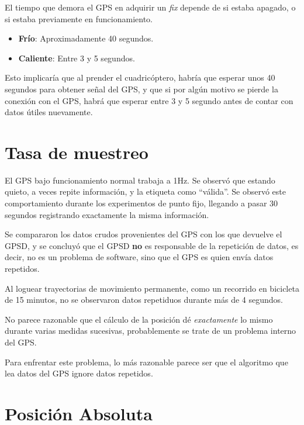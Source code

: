 \documentclass[main]{subfiles}
\begin{document}
El tiempo que demora el GPS en adquirir un \textit{fix} depende de si estaba apagado, o si estaba previamente en funcionamiento.
\begin{itemize}
\item \textbf{Frío}: Aproximadamente 40 segundos.
\item \textbf{Caliente}: Entre 3 y 5 segundos.
\end{itemize}

Esto implicaría que al prender el cuadricóptero, habría que esperar unos 40 segundos para obtener se\~nal del GPS, y que si por algún motivo se pierde la conexión con el GPS, habrá que esperar entre 3 y 5 segundo antes de contar con datos útiles nuevamente.

\section{Tasa de muestreo}
\label{sec:tasa-de-muestreo}

El GPS bajo funcionamiento normal trabaja a 1Hz. Se observó que estando quieto, a veces repite información, y la etiqueta como ``válida''. Se observó este comportamiento durante los experimentos de punto fijo, llegando a pasar 30 segundos registrando exactamente la misma información.

Se compararon los datos crudos provenientes del GPS con los que devuelve el GPSD, y se concluyó que el GPSD \textbf{no} es responsable de la repetición de datos, es decir, no es un problema de software, sino que el GPS es quien env\'ia datos repetidos.

Al loguear trayectorias de movimiento permanente, como un recorrido en bicicleta de 15 minutos, no se observaron  datos repetiduos durante más de 4 segundos.

No parece razonable que el cálculo de la posición dé \textit{exactamente} lo mismo durante varias medidas sucesivas, probablemente se trate de un problema interno del GPS.

Para enfrentar este problema, lo más razonable parece ser que el algoritmo que lea datos del GPS ignore datos repetidos.

\section{Posición Absoluta}
\label{sec:posicion-absoluta}
\end{document}
